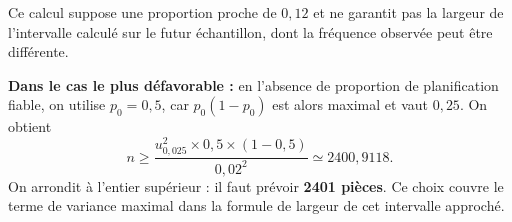 {\begin{enumerate}
{Ce calcul suppose une proportion proche de $0{,}12$ et ne garantit pas la largeur de l'intervalle calculé sur le futur échantillon, dont la fréquence observée peut être différente.

\textbf{Dans le cas le plus défavorable :} en l'absence de proportion de planification fiable, on utilise $p_0=0{,}5$, car $p_0(1-p_0)$ est alors maximal et vaut $0{,}25$. On obtient
\[
n\geq\frac{u_{0{,}025}^2\times0{,}5\times(1-0{,}5)}{0{,}02^2}
\simeq2400{,}9118.
\]
On arrondit à l'entier supérieur : il faut prévoir \textbf{2401 pièces}. Ce choix couvre le terme de variance maximal dans la formule de largeur de cet intervalle approché.
}
\end{enumerate}
}
